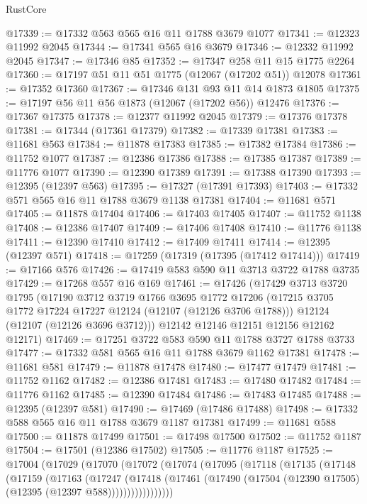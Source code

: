 \begin{lexlean}{RustCore}
\begin{coremodule}
@17339 := @17332 @563 @565 @16 @11 @1788 @3679 @1077
@17341 := @12323 @11992 @2045
@17344 := @17341 @565 @16 @3679
@17346 := @12332 @11992 @2045
@17347 := @17346 @85
@17352 := @17347 @258 @11 @15 @1775 @2264
@17360 := @17197 @51 @11 @51 @1775 (@12067 (@17202 @51)) @12078
@17361 := @17352 @17360
@17367 := @17346 @131 @93 @11 @14 @1873 @1805
@17375 := @17197 @56 @11 @56 @1873 (@12067 (@17202 @56)) @12476
@17376 := @17367 @17375
@17378 := @12377 @11992 @2045
@17379 := @17376 @17378
@17381 := @17344 (@17361 @17379)
@17382 := @17339 @17381
@17383 := @11681 @563
@17384 := @11878 @17383
@17385 := @17382 @17384
@17386 := @11752 @1077
@17387 := @12386 @17386
@17388 := @17385 @17387
@17389 := @11776 @1077
@17390 := @12390 @17389
@17391 := @17388 @17390
@17393 := @12395 (@12397 @563)
@17395 := @17327 (@17391 @17393)
@17403 := @17332 @571 @565 @16 @11 @1788 @3679 @1138 @17381
@17404 := @11681 @571
@17405 := @11878 @17404
@17406 := @17403 @17405
@17407 := @11752 @1138
@17408 := @12386 @17407
@17409 := @17406 @17408
@17410 := @11776 @1138
@17411 := @12390 @17410
@17412 := @17409 @17411
@17414 := @12395 (@12397 @571)
@17418 := @17259 (@17319 (@17395 (@17412 @17414)))
@17419 := @17166 @576
@17426 := @17419 @583 @590 @11 @3713 @3722 @1788 @3735
@17429 := @17268 @557 @16 @169
@17461 := @17426
    (@17429
      @3713
      @3720
      @1795
      (@17190
        @3712
        @3719
        @1766
        @3695
        @1772
        @17206
        (@17215 @3705 @1772 @17224 @17227 @12124 (@12107 (@12126 @3706 @1788)))
        @12124
        (@12107 (@12126 @3696 @3712)))
      @12142
      @12146
      @12151
      @12156
      @12162
      @12171)
@17469 := @17251 @3722 @583 @590 @11 @1788 @3727 @1788 @3733
@17477 := @17332 @581 @565 @16 @11 @1788 @3679 @1162 @17381
@17478 := @11681 @581
@17479 := @11878 @17478
@17480 := @17477 @17479
@17481 := @11752 @1162
@17482 := @12386 @17481
@17483 := @17480 @17482
@17484 := @11776 @1162
@17485 := @12390 @17484
@17486 := @17483 @17485
@17488 := @12395 (@12397 @581)
@17490 := @17469 (@17486 @17488)
@17498 := @17332 @588 @565 @16 @11 @1788 @3679 @1187 @17381
@17499 := @11681 @588
@17500 := @11878 @17499
@17501 := @17498 @17500
@17502 := @11752 @1187
@17504 := @17501 (@12386 @17502)
@17505 := @11776 @1187
@17525 := @17004
    (@17029
      (@17070
        (@17072
          (@17074
            (@17095
              (@17118
                (@17135
                  (@17148
                    (@17159
                      (@17163
                        (@17247
                          (@17418
                            (@17461
                              (@17490 (@17504 (@12390 @17505) (@12395 (@12397 @588)))))))))))))))))

\end{coremodule}
\end{lexlean}
